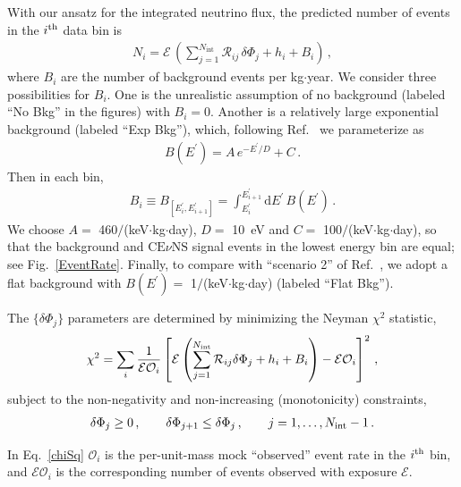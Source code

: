 \documentclass[a4paper,11pt]{article}
\renewcommand\({\left(}
\renewcommand\){\right)}
\renewcommand\[{\left[}
\renewcommand\]{\right]}
\newcommand{\tx}{\text}
\newcommand{\df}{\text{d}}
\newcommand{\al}[1]{\begin{align}#1\end{align}}
\newcommand{\paren}[1]{\left(#1\right)}
\newcommand{\pn}[1]{\left(#1\right)}
\newcommand{\sqbr}[1]{\left[#1\right]}
\newcommand{\fn}[1]{\!\paren{#1}} %
\theoremstyle{definition}
\newcommand{\mc}{\mathcal}
\newcommand{\pr}{\prime}
\newcommand{\CEnNS}{\text{CE}\nu\text{NS}}
\begin{document}
 With our ansatz for the integrated neutrino flux, the  predicted number of events in the $i^{\rm th}$ data bin is
\al{
    N_i = \mc E\,\pn{\sum_{j = 1}^{N_\tx{int}} \mc R_{ij}\,\delta\Phi_j + h_i + B_i}\,,
    \label{eq:Ni-predicted}
}
where $B_i$ are the number of background events per kg$\cdot$year. 
We consider three possibilities for $B_i$.
One is the unrealistic assumption of no background (labeled ``No Bkg'' in the figures) with $B_i=0$. 
Another is a relatively large exponential background (labeled ``Exp Bkg''), which, following Ref.~\cite{NUCLEUS:2019igx} we parameterize as
\al{
    B\fn{E^\pr} = A\,e^{-E^\pr/D} + C\,.
\label{bkg-form}
}
Then in each bin,
%
\al{
    B_i \equiv B_{\sqbr{E_i^\pr, E_{i + 1}^\pr}} = \int_{E^\pr_i}^{E^\pr_{i + 1}} \df E^\pr\, B\fn{E^\pr}\,.
    \label{bkg}
}
We choose $A=$ 460$/$(keV$\cdot$kg$\cdot$day), $D=$ 10~eV and $C=$ 100$/$(keV$\cdot$kg$\cdot$day), so that the background and $\CEnNS$ signal events in the lowest energy bin are equal; see Fig.~\ref{EventRate}.
Finally, to compare with ``scenario 2''  of Ref.~\cite{Liao:2023kyy}, we adopt a flat background with $B\fn{E^\pr} =$ 1$/$(keV$\cdot$kg$\cdot$day) (labeled ``Flat Bkg''). 

 The $\{\delta\Phi_j\}$ parameters are determined by minimizing the Neyman $\chi^2$ statistic,
\al{
    \chi^2 = \sum_i {1\over \mc E\mc O_i} \sqbr{\mc E\pn{\displaystyle\sum_{j = 1}^{N_\tx{int}}\mathcal R_{ij}\delta\Phi_j + h_i + B_i} - \mc E\mc O_i}^2\,,
\label{chiSq}
}
subject to the non-negativity and non-increasing (monotonicity) constraints,
\al{
    \delta\Phi_j \geq 0\,, \qquad \delta\Phi_{j+1} \leq \delta\Phi_j\,, \qquad j = 1, \ldots, N_{\rm int} - 1\,.
\label{eq:constraints}
}

In Eq.~\eqref{chiSq} $\mc O_i$ is the per-unit-mass mock ``observed'' event rate in the $i^{\rm th}$ bin,
and $\mc E \mc O_i$ is the corresponding number of events observed with exposure $\mc E$. 
 
\end{document}
